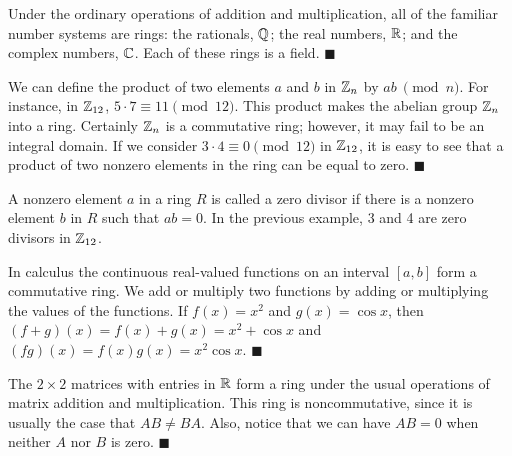  
Under the ordinary operations of addition and multiplication, all of
the familiar number systems are rings: the rationals, ${\Bbb Q}$; the
real numbers, ${\Bbb R}$; and the complex numbers, ${\Bbb C}$. Each of
these rings is a field. 
\hspace{\fill} $\blacksquare$
 
 
\vspace{2ex}
 
 
We can define the product of two elements $a$ and $b$ in ${\Bbb Z}_n$
by $ab~\pmod{n}$. For instance, in ${\Bbb Z}_{12}$,  $5 \cdot 7 \equiv
11 \pmod{12}$.  This product makes the abelian group ${\Bbb Z}_n$ into
a ring. Certainly ${\Bbb Z}_n$ is a commutative ring; however, it may
fail to be an integral domain.  If we consider $3 \cdot 4 \equiv 0
\pmod{12}$ in ${\Bbb Z}_{12}$, it is easy to see that a product of two 
nonzero elements in the ring can be equal to zero.  
\hspace{\fill} $\blacksquare$
 
 
\vspace{2ex}
 
 
A nonzero element $a$ in a ring $R$ is called a {\bfi zero
divisor\/} if there is a nonzero element $b$ in $R$
such that $ab = 0$. In the previous example,  3 and 4 are zero
divisors in ${\Bbb Z}_{12}$.  
 
 
\vspace{2ex}
 
 
In calculus the continuous real-valued functions on an interval
$[a,b]$ form a commutative ring. We add or multiply two functions by 
adding or multiplying the values of the functions.  If $f(x) = x^2$ and
$g(x) = \cos x$, then $(f+g)(x) = f(x) + g(x) = x^2 + \cos x$ and
$(fg)(x) = f(x) g(x) = x^2 \cos x$.
\mbox{\hspace{1in}}
\hspace{\fill} $\blacksquare$
 
 
\vspace{2ex}
 
 
The $2 \times 2$ matrices  with entries in ${\Bbb R}$ form a ring
under the usual operations of matrix addition and multiplication. This
ring is \mbox{noncommutative}, since it is usually the case that $AB \neq
BA$. Also, notice that we can have $AB = 0$ when neither $A$ nor $B$
is zero. 
\hspace{\fill} $\blacksquare$
 
 
\vspace{2ex}
 
